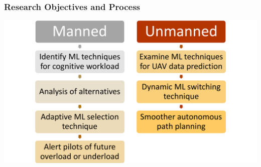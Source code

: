\documentclass{beamer}
\begin{document}
\begin{frame}
\frametitle{Research Objectives and Process}
\includegraphics[width=\textwidth]{process}
\end{frame}

\end{document}
